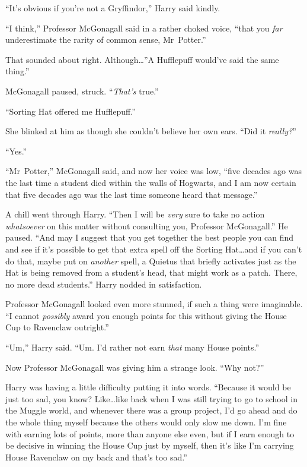 “It’s obvious if you’re not a Gryffindor,” Harry said kindly.

“I think,” Professor McGonagall said in a rather choked voice, “that you \emph{far} underestimate the rarity of common sense, Mr~Potter.”

That sounded about right. Although…”A Hufflepuff would’ve said the same thing.”

McGonagall paused, struck. “\emph{That’s} true.”

“Sorting Hat offered me Hufflepuff.”

She blinked at him as though she couldn’t believe her own ears. “Did it \emph{really?}”

“Yes.”

“Mr~Potter,” McGonagall said, and now her voice was low, “five decades ago was the last time a student died within the walls of Hogwarts, and I am now certain that five decades ago was the last time someone heard that message.”

A chill went through Harry. “Then I will be \emph{very} sure to take no action \emph{whatsoever} on this matter without consulting you, Professor McGonagall.” He paused. “And may I suggest that you get together the best people you can find and see if it’s possible to get that extra spell off the Sorting Hat…and if you can’t do that, maybe put on \emph{another} spell, a Quietus that briefly activates just as the Hat is being removed from a student’s head, that might work as a patch. There, no more dead students.” Harry nodded in satisfaction.

Professor McGonagall looked even more stunned, if such a thing were imaginable. “I cannot \emph{possibly} award you enough points for this without giving the House Cup to Ravenclaw outright.”

“Um,” Harry said. “Um. I’d rather not earn \emph{that} many House points.”

Now Professor McGonagall was giving him a strange look. “Why not?”

Harry was having a little difficulty putting it into words. “Because it would be just too sad, you know? Like…like back when I was still trying to go to school in the Muggle world, and whenever there was a group project, I’d go ahead and do the whole thing myself because the others would only slow me down. I’m fine with earning lots of points, more than anyone else even, but if I earn enough to be decisive in winning the House Cup just by myself, then it’s like I’m carrying House Ravenclaw on my back and that’s too sad.”


